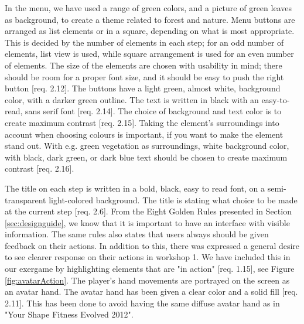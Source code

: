 In the menu, we have used a range of green colors, and a picture of green leaves as background, to create a theme related to forest and nature. Menu buttons are arranged as list elements or in a square, depending on what is most appropriate. This is decided by the number of elements in each step; for an odd number of elements, list view is used, while square arrangement is used for an even number of elements. The size of the elements are chosen with usability in mind; there should be room for a proper font size, and it should be easy to push the right button [req. 2.12]. The buttons have a light green, almost white, background color, with a darker green outline. The text is written in black with an easy-to-read, sans serif font [req. 2.14]. The choice of background and text color is to create maximum contrast [req. 2.15]. Taking the element's surroundings into account when choosing colours is important, if you want to make the element stand out. With e.g. green vegetation as surroundings, white background color, with black, dark green, or dark blue text should be chosen to create maximum contrast [req. 2.16]. 

The title on each step is written in a bold, black, easy to read font, on a semi-transparent light-colored background. The title is stating what choice to be made at the current step [req. 2.6]. From the Eight Golden Rules presented in Section \ref{sec:designguide}, we know that it is important to have an interface with visible information. The same rules also states that users always should be given feedback on their actions. In addition to this, there was expressed a general desire to see clearer response on their actions in workshop 1. We have included this in our exergame by highlighting elements that are "in action" [req. 1.15], see Figure \ref{fig:avatarAction}. The player's hand movements are portrayed on the screen as an avatar hand. The avatar hand has been given a clear color and a solid fill [req. 2.11]. This has been done to avoid having the same diffuse avatar hand as in "Your Shape Fitness Evolved 2012".  

